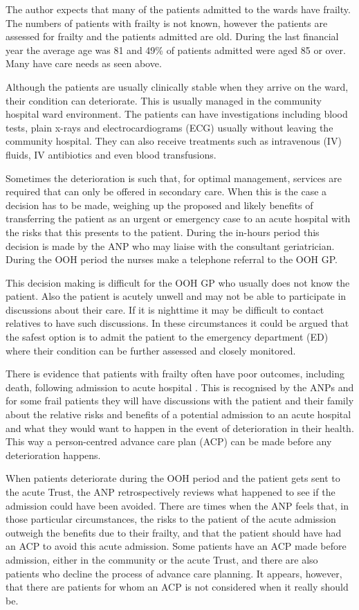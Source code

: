 \documentclass
[
	12pt,
	a4paper,
	oneside,
]{article}
\begin{document}
The author expects that many of the patients admitted to the wards have frailty.
The numbers of patients with frailty is not known, however the patients are assessed 
for frailty and the patients admitted are old. During the last financial year the
average age was 81 and 49\% of patients admitted were aged 85 or over. Many have 
care needs as seen above.

Although the patients are usually clinically stable when they arrive on the ward,
their condition can deteriorate. This is usually managed in the community hospital
ward environment. The patients can have investigations including blood tests, plain
x-rays and electrocardiograms (ECG) usually without leaving the community hospital.
They can also receive treatments such as intravenous (IV) fluids, IV antibiotics
and even blood transfusions. 

Sometimes the deterioration is such that, 
for optimal management, services are required that can only be offered in secondary 
care. When this is the case a decision has to be made, weighing up the proposed
and likely benefits of transferring the patient as an urgent or emergency case to
an acute hospital with the risks that this presents to the patient. During the in-hours
period this decision is made by the ANP who may liaise with the consultant geriatrician. During
the OOH period the nurses make a telephone referral to the OOH GP.

This decision making is difficult for the OOH GP who usually does not know the patient.
Also the patient is acutely unwell and may not be able to participate in discussions
about their care. If it is nighttime it may be difficult to contact relatives to 
have such discussions. In these circumstances it could
be argued that the safest option is to admit the patient to the emergency department (ED) where their 
condition can be further assessed and closely monitored.

There is evidence that patients with frailty often have poor outcomes, including death,
following admission to acute hospital \parencite{silver:12, wallis:15}. 
This is recognised by the ANPs and for some frail patients they 
will have discussions with the patient and their family about the relative risks
and benefits of a potential admission to an acute hospital and what they would want to 
happen in the event of deterioration in their health. This way a person-centred 
advance care plan (ACP) can be made before any deterioration happens.

When patients deteriorate during the OOH period and the patient
gets sent to the acute Trust, the ANP retrospectively reviews what happened to see if the admission
could have been avoided. There are times when the ANP feels that, in those particular
circumstances, the risks to the patient of the acute admission outweigh the benefits
due to their frailty, and that the patient should have had an ACP
to avoid this acute admission. Some patients have an ACP made before admission, 
either in the community or the acute Trust,
and there are also patients who decline the process of advance care planning. It appears,
however, that there are patients for whom an ACP is not considered when it really should be.
\end{document}
